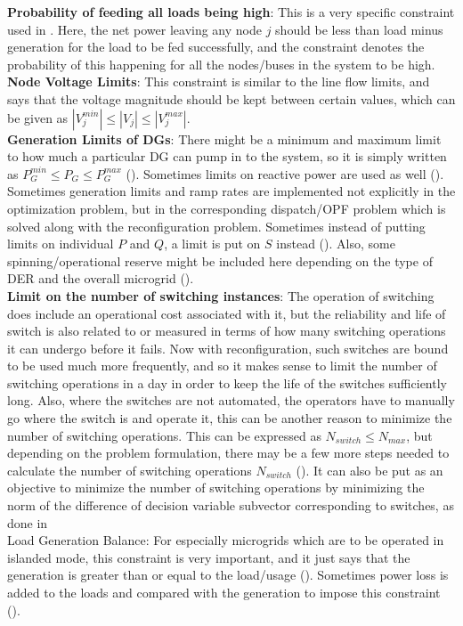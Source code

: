 \textbf{Probability of feeding all loads being high}: This is a very specific constraint used in \citep{mgrj02}. Here, the net power leaving any node $j$ should be less than load minus generation for the load to be fed successfully, and the constraint denotes the probability of this happening for all the nodes/buses in the system to be high.\\
\textbf{Node Voltage Limits}: This constraint is similar to the line flow limits, and says that the voltage magnitude should be kept between certain values, which can be given as $|V_j^{min}|\le|V_j|\le|V_j^{max}|$.\\
\textbf{Generation Limits of DGs}: There might be a minimum and maximum limit to how much a particular DG can pump in to the system, so it is simply written as $P_G^{min}\le P_G\le P_G^{max}$ (\citep{mgrj03}). Sometimes limits on reactive power are used as well (\citep{mgrj57}). Sometimes generation limits and ramp rates are implemented not explicitly in the optimization problem, but in the corresponding dispatch/OPF problem which is solved along with the reconfiguration problem. Sometimes instead of putting limits on individual $P$ and $Q$, a limit is put on $S$ instead (\citep{mgrj14}). Also, some spinning/operational reserve might be included here depending on the type of DER and the overall microgrid (\citep{mgrj07}).\\
\textbf{Limit on the number of switching instances}: The operation of switching does include an operational cost associated with it, but the reliability and life of switch is also related to or measured in terms of how many switching operations it can undergo before it fails. Now with reconfiguration, such switches are bound to be used much more frequently, and so it makes sense to limit the number of switching operations in a day in order to keep the life of the switches sufficiently long. Also, where the switches are not automated, the operators have to manually go where the switch is and operate it, this can be another reason to minimize the number of switching operations. This can be expressed as $N_{switch}\le N_{max}$, but depending on the problem formulation, there may be a few more steps needed to calculate the number of switching operations $N_{switch}$ (\citep{mgrj49}). It can also be put as an objective to minimize the number of switching operations by minimizing the norm of the difference of decision variable subvector corresponding to switches, as done in \citep{mgrj04}\\
Load Generation Balance: For especially microgrids which are to be operated in islanded mode, this constraint is very important, and it just says that the generation is greater than or equal to the load/usage (\citep{mgrj03}). Sometimes power loss is added to the loads and compared with the generation to impose this constraint (\citep{mgrj07}).\\

